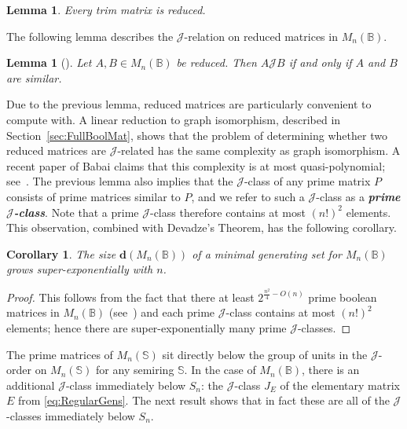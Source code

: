 \documentclass[11pt]{article}
\newtheorem{cor}[thm]{Corollary}
\newtheorem{lemma}[thm]{Lemma}
\newcommand{\defn}[1]{\textbf{\textit{#1}}}
\numberwithin{equation}{section}
\newcommand{\B}{\mathbb{B}}
\newcommand{\Bn}{M_n(\B)}
\newcommand{\J}{\mathscr{J}}
\begin{document}
\begin{lemma}
  Every trim matrix is reduced.
\end{lemma}

The following lemma describes the $\J$-relation on reduced matrices in $\Bn$.

\begin{lemma}[{\cite[Theorem 1.8]{Plemmons1970aa}}]
  Let $A, B \in \Bn$ be reduced. Then $A \J B$ if and only if $A$ and $B$ are
  similar.
\end{lemma}

Due to the previous lemma, reduced matrices are particularly convenient to
compute with. A linear reduction to graph isomorphism, described in
Section~\ref{sec:FullBoolMat}, shows that the problem of determining whether two
reduced matrices are $\J$-related has the same complexity as graph isomorphism.
A recent paper of Babai claims that this complexity is at most quasi-polynomial;
see~\cite{Babai2016aa}.
The previous lemma also implies that the $\J$-class of any prime matrix $P$
consists of prime matrices similar to $P$, and we refer to such a $\J$-class as
a \defn{prime $\J$-class}. Note that a prime $\J$-class therefore contains at
most $(n!)^2$ elements. This observation, combined with Devadze's Theorem, has
the following corollary.

\begin{cor}
  The size $\mathbf{d}(\Bn)$ of a minimal generating set for $\Bn$ grows
  super-exponentially with $n$.
\end{cor}
\begin{proof}
  This follows from the fact that there at least $2^{\frac{n^2}{4} - O(n)}$
  prime boolean matrices in $\Bn$ (see~\cite[Theorem 2.4.1]{Kim1982aa}) and each
  prime $\J$-class contains at most $(n!)^2$ elements; hence there are
  super-exponentially many prime $\J$-classes.
\end{proof}

The prime matrices of $M_n(\mathbb{S})$ sit directly below the group of units in
the $\J$-order on $M_n(\mathbb{S})$ for any semiring $\mathbb{S}$. In the case of
$\Bn$, there is an additional $\J$-class immediately below $S_n$: the $\J$-class
$J_E$ of the elementary matrix $E$ from \eqref{eq:RegularGens}. The next result shows that in
fact these are all of the $\J$-classes immediately below $S_n$.
\end{document}
